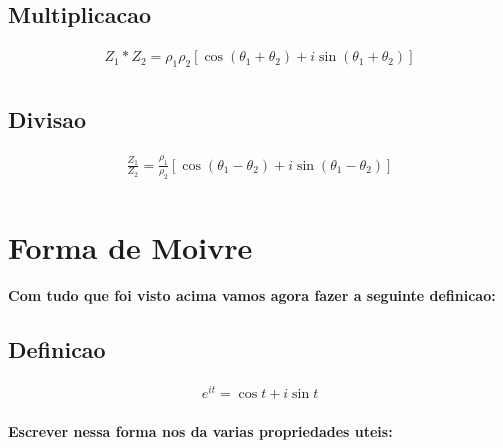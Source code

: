 \documentclass[12pt,twoside, a4paper, twocolumn]{article}
\begin{document}
\subsection{Multiplicacao}
\begin{equation}
    \begin{aligned}
        Z_1 * Z_2 = \rho_1 \rho_2  \left[\cos(\theta_1+\theta_2) + i  \sin(\theta_1+\theta_2)\right] \\
    \end{aligned}
\end{equation}

\subsection{Divisao}
\begin{equation}
    \begin{aligned}
        \frac{Z_1}{Z_2} = \frac{\rho_1}{\rho_2}   \left[\cos(\theta_1-\theta_2) + i  \sin(\theta_1-\theta_2)\right] \\
    \end{aligned}
\end{equation}

\section{Forma de Moivre}
\paragraph{Com tudo que foi visto acima vamos agora fazer a seguinte definicao:}
\subsection{Definicao}
\begin{equation}
    \begin{aligned}
        e^{it} = \cos{t} + i \sin{t}
    \end{aligned}
\end{equation}
\paragraph{Escrever nessa forma nos da varias propriedades uteis:}
\end{document}
